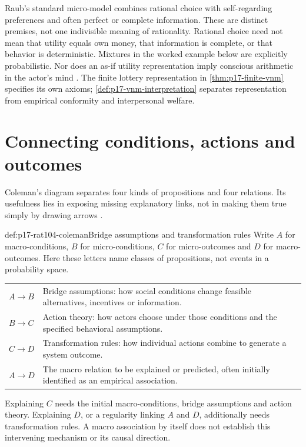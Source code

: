 Raub's standard micro-model combines rational choice with self-regarding
preferences and often perfect or complete information. These are distinct
premises, not one indivisible meaning of rationality. Rational choice need
not mean that utility equals own money, that information is complete, or
that behavior is deterministic. Mixtures in the worked example below are
explicitly probabilistic. Nor does an as-if utility representation imply
conscious arithmetic in the actor's mind
\parencite[pp.~616--617, 619]{Raub2021RationalChoiceSocialSciences}.
The finite lottery representation in \cref{thm:p17-finite-vnm} specifies its
own axioms; \cref{def:p17-vnm-interpretation} separates representation from
empirical conformity and interpersonal welfare.

\section{Connecting conditions, actions and outcomes}
\label{sec:p17-rat104-links}

Coleman's diagram separates four kinds of propositions and four relations.
Its usefulness lies in exposing missing explanatory links, not in making
them true simply by drawing arrows
\parencite[pp.~611--614, figs.~10.4.1--2]{Raub2021RationalChoiceSocialSciences}.

\begin{hbdefinition}{def:p17-rat104-coleman}{Bridge assumptions and transformation rules}
Write \(A\) for macro-conditions, \(B\) for micro-conditions,
\(C\) for micro-outcomes and \(D\) for macro-outcomes. Here these letters
name classes of propositions, not events in a probability space.
\begin{center}
\begin{tabular}{p{}p{}}
\(A\longrightarrow B\) & Bridge assumptions: how social conditions
change feasible alternatives, incentives or information.\\
\(B\longrightarrow C\) & Action theory: how actors choose under those
conditions and the specified behavioral assumptions.\\
\(C\longrightarrow D\) & Transformation rules: how individual actions
combine to generate a system outcome.\\
\(A\longrightarrow D\) & The macro relation to be explained or predicted,
often initially identified as an empirical association.
\end{tabular}
\end{center}
Explaining \(C\) needs the initial macro-conditions, bridge assumptions and
action theory. Explaining \(D\), or a regularity linking \(A\) and \(D\),
additionally needs transformation rules. A macro association by itself does
not establish this intervening mechanism or its causal direction.
\end{hbdefinition}

